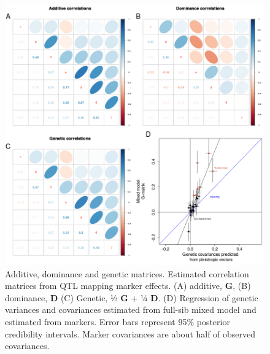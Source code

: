 \begin{refsection}
\begin{figure}
\includegraphics[width=\linewidth]{chapter_JoH-Melo_etal/media/growth_cov_prediction_composite.png}
\caption[Additive, dominance and genetic matrices]{Additive, dominance and genetic matrices. Estimated
correlation matrices from QTL mapping marker effects. (A) additive, \textbf{G}, (B)
dominance, \textbf{D} (C) Genetic, ½ \textbf{G} + ¼ \textbf{D}. (D) Regression of
genetic variances and covariances estimated from full-sib mixed model
and estimated from markers. Error bars represent 95\% posterior
credibility intervals. Marker covariances are about half of observed
covariances.}
\end{figure}


\end{refsection}
